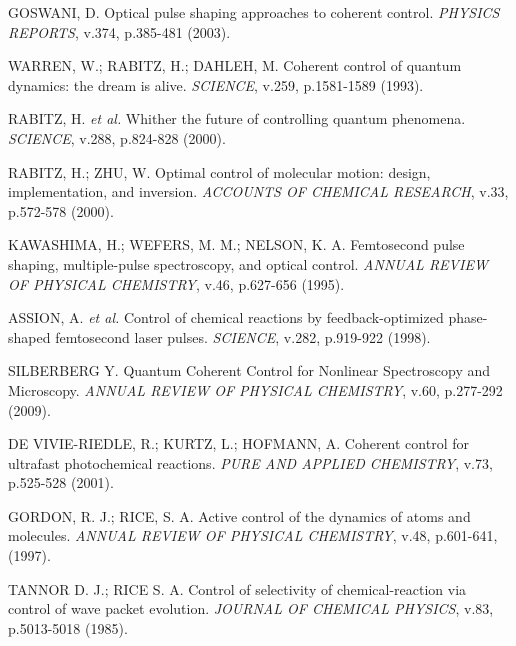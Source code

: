 \begin{thebibliography}{99}



 GOSWANI, D. Optical pulse shaping approaches to coherent control. {\it PHYSICS REPORTS}, v.374, p.385-481 (2003).

 WARREN, W.; RABITZ, H.; DAHLEH, M. Coherent control of quantum dynamics: the dream is alive. {\it SCIENCE}, v.259, p.1581-1589 (1993).

 RABITZ, H. {\it et al.} Whither the future of controlling quantum phenomena. {\it SCIENCE}, v.288, p.824-828 (2000).

  RABITZ, H.; ZHU, W. Optimal control of molecular motion: design, implementation, and inversion. {\it ACCOUNTS OF CHEMICAL RESEARCH}, v.33, p.572-578 (2000).

 KAWASHIMA, H.; WEFERS, M. M.; NELSON, K. A. Femtosecond pulse shaping, multiple-pulse spectroscopy, and optical control. {\it ANNUAL REVIEW OF PHYSICAL CHEMISTRY}, v.46, p.627-656 (1995).

 ASSION, A. {\it et al.} Control of chemical reactions by feedback-optimized phase-shaped femtosecond laser pulses. {\it SCIENCE}, v.282, p.919-922 (1998).

 SILBERBERG Y. Quantum Coherent Control for Nonlinear Spectroscopy and Microscopy. {\it ANNUAL REVIEW OF PHYSICAL CHEMISTRY}, v.60, p.277-292 (2009).

 DE VIVIE-RIEDLE, R.; KURTZ, L.; HOFMANN, A. Coherent control for ultrafast photochemical reactions. {\it PURE AND APPLIED CHEMISTRY}, v.73, p.525-528 (2001).

 GORDON, R. J.; RICE, S. A. Active control of the dynamics of atoms and molecules. {\it ANNUAL REVIEW OF PHYSICAL CHEMISTRY}, v.48, p.601-641, (1997).

 TANNOR D. J.; RICE S. A. Control of selectivity of chemical-reaction via control of wave packet evolution. {\it JOURNAL OF CHEMICAL PHYSICS}, v.83, p.5013-5018 (1985).


\end{thebibliography}
